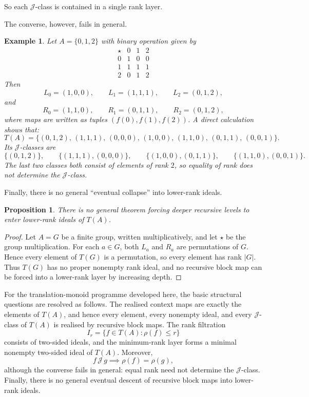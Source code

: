 \documentclass[11pt]{article}
\newtheorem{proposition}[theorem]{Proposition}
\newtheorem{example}[theorem]{Example}
\begin{document}
So each \(\mathcal J\)-class is contained in a single rank layer.

The converse, however, fails in general.

\begin{example}\label{ex:rank-not-J}
Let \(A=\{0,1,2\}\) with binary operation given by
\[
\begin{array}{c|ccc}
\star & 0 & 1 & 2\\ \hline
0 & 1 & 0 & 0\\
1 & 1 & 1 & 1\\
2 & 0 & 1 & 2
\end{array}
\]
Then
\[
L_0=(1,0,0),\qquad L_1=(1,1,1),\qquad L_2=(0,1,2),
\]
and
\[
R_0=(1,1,0),\qquad R_1=(0,1,1),\qquad R_2=(0,1,2),
\]
where maps are written as tuples \((f(0),f(1),f(2))\). A direct calculation shows that:
\[
T(A)=\{
(0,1,2),\,
(1,1,1),\,
(0,0,0),\,
(1,0,0),\,
(1,1,0),\,
(0,1,1),\,
(0,0,1)
\}.
\]
Its \(\mathcal J\)-classes are
\[
\{(0,1,2)\},
\qquad
\{(1,1,1),(0,0,0)\},
\qquad
\{(1,0,0),(0,1,1)\},
\qquad
\{(1,1,0),(0,0,1)\}.
\]
The last two classes both consist of elements of rank \(2\), so equality of
rank does not determine the \(\mathcal J\)-class.
\end{example}
Finally, there is no general ``eventual collapse'' into lower-rank ideals.
\begin{proposition}\label{prop:no-eventual-collapse}
There is no general theorem forcing deeper recursive levels to enter lower-rank
ideals of \(T(A)\).
\end{proposition}

\begin{proof}
Let \(A=G\) be a finite group, written multiplicatively, and let \(\star\) be
the group multiplication. For each \(a\in G\), both \(L_a\) and \(R_a\) are
permutations of \(G\). Hence every element of \(T(G)\) is a permutation, so
every element has rank \(|G|\). Thus \(T(G)\) has no proper nonempty rank ideal,
and no recursive block map can be forced into a lower-rank layer by increasing
depth.
\end{proof}

For the translation-monoid programme developed here, the basic structural
questions are resolved as follows. The realised context maps are exactly the
elements of \(T(A)\), and hence every element, every nonempty ideal, and every
\(\mathcal J\)-class of \(T(A)\) is realised by recursive block maps. The rank
filtration
\[
I_r=\{f\in T(A):\rho(f)\le r\}
\]
consists of two-sided ideals, and the minimum-rank layer forms a minimal
nonempty two-sided ideal of \(T(A)\). Moreover,
\[
f\,\mathcal J\, g \implies \rho(f)=\rho(g),
\]
although the converse fails in general: equal rank need not determine the
\(\mathcal J\)-class. Finally, there is no general eventual descent of recursive
block maps into lower-rank ideals.
\end{document}
